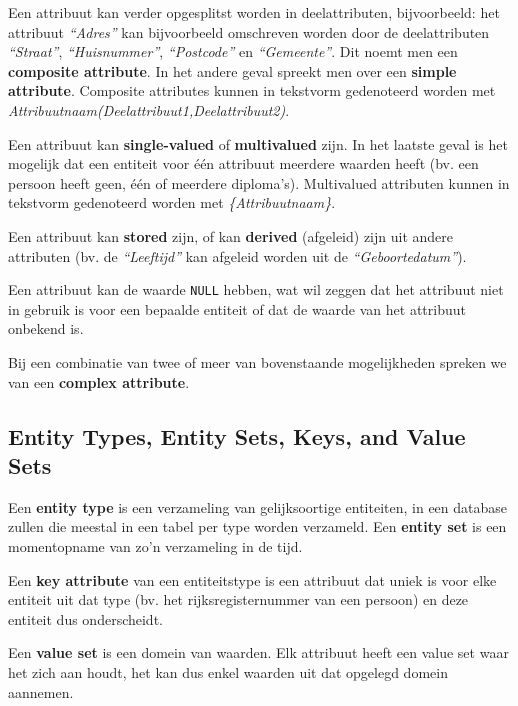 Een attribuut kan verder opgesplitst worden in deelattributen, bijvoorbeeld: het attribuut \textit{``Adres''} kan bijvoorbeeld omschreven worden door de deelattributen \textit{``Straat''}, \textit{``Huisnummer''}, \textit{``Postcode''} en \textit{``Gemeente''}. Dit noemt men een \textbf{composite attribute}. In het andere geval spreekt men over een \textbf{simple attribute}. Composite attributes kunnen in tekstvorm gedenoteerd worden met \textit{Attribuutnaam(Deelattribuut1,Deelattribuut2)}.

Een attribuut kan \textbf{single-valued} of \textbf{multivalued} zijn. In het laatste geval is het mogelijk dat een entiteit voor \'e\'en attribuut meerdere waarden heeft (bv. een persoon heeft geen, \'e\'en of meerdere diploma's). Multivalued attributen kunnen in tekstvorm gedenoteerd worden met \textit{\{Attribuutnaam\}}.

Een attribuut kan \textbf{stored} zijn, of kan \textbf{derived} (afgeleid) zijn uit andere attributen (bv. de \textit{``Leeftijd''} kan afgeleid worden uit de \textit{``Geboortedatum''}).

Een attribuut kan de waarde \texttt{NULL} hebben, wat wil zeggen dat het attribuut niet in gebruik is voor een bepaalde entiteit of dat de waarde van het attribuut onbekend is.

Bij een combinatie van twee of meer van bovenstaande mogelijkheden spreken we van een \textbf{complex attribute}.

\subsection{Entity Types, Entity Sets, Keys, and Value Sets}
Een \textbf{entity type} is een verzameling van gelijksoortige entiteiten, in een database zullen die meestal in een tabel per type worden verzameld. Een \textbf{entity set} is een momentopname van zo'n verzameling in de tijd.

Een \textbf{key attribute} van een entiteitstype is een attribuut dat uniek is voor elke entiteit uit dat type (bv. het rijksregisternummer van een persoon) en deze entiteit dus onderscheidt.

Een \textbf{value set} is een domein van waarden. Elk attribuut heeft een value set waar het zich aan houdt, het kan dus enkel waarden uit dat opgelegd domein aannemen.



